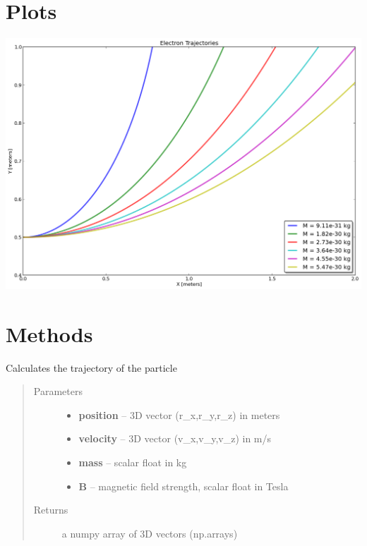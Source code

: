 \documentclass[letterpaper,10pt,english]{sphinxmanual}
\begin{document}
\section{Plots}
\label{index:id8}
\includegraphics{trajectory.png}


\section{Methods}
\label{index:id9}\label{index:module-electronTrajectory}

\begin{fulllineitems}
\label{index:electronTrajectory.calculate_trajectory}
Calculates the trajectory of the particle
\begin{quote}\begin{description}
\item[{Parameters}] \leavevmode\begin{itemize}
\item {} 
\textbf{position} -- 3D vector (r\_x,r\_y,r\_z) in meters

\item {} 
\textbf{velocity} -- 3D vector (v\_x,v\_y,v\_z) in m/s

\item {} 
\textbf{mass} -- scalar float in kg

\item {} 
\textbf{B} -- magnetic field strength, scalar float in Tesla

\end{itemize}

\item[{Returns}] \leavevmode
a numpy array of 3D vectors (np.arrays)

\end{description}\end{quote}

\end{fulllineitems}
\end{document}
